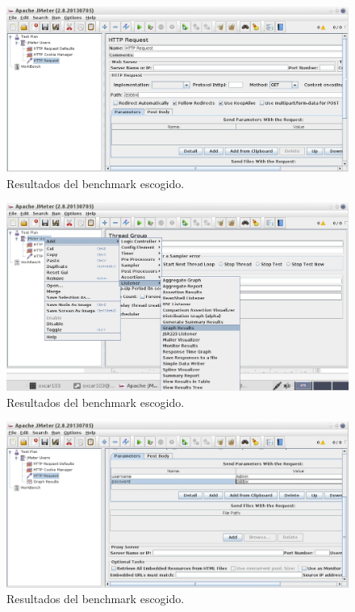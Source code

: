 \documentclass[paper=a4, fontsize=11pt]{scrartcl} %
\numberwithin{equation}{section} %
\numberwithin{figure}{section} %
\numberwithin{table}{section} %
\begin{document}
\begin{enumerate}
		
		
		\begin{figure}[H]
			\centering
			\includegraphics[width=15cm]{Ejercicio_7g.jpg}
			\caption{Resultados del benchmark escogido.}
			\label{fig:phoro}
		\end{figure}
		
		
		
		\begin{figure}[H]
			\centering
			\includegraphics[width=15cm]{Ejercicio_7h.jpg}
			\caption{Resultados del benchmark escogido.}
			\label{fig:phor}
		\end{figure}
		
		
		
		\begin{figure}[H]
			\centering
			\includegraphics[width=15cm]{Ejercicio_7i.jpg}
			\caption{Resultados del benchmark escogido.}
			\label{fig:phori}
		\end{figure}
		

\end{enumerate}
\end{document}
